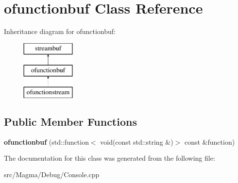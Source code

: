\hypertarget{classofunctionbuf}{}\section{ofunctionbuf Class Reference}
\label{classofunctionbuf}
Inheritance diagram for ofunctionbuf\+:\begin{figure}[H]
\begin{center}
\leavevmode
\includegraphics[height=3.000000cm]{classofunctionbuf}
\end{center}
\end{figure}
\subsection*{Public Member Functions}
\begin{DoxyCompactItemize}
\item 
\mbox{\label{classofunctionbuf_ac4c827b2738de8c625a1316e15643f3d}} 
{\bfseries ofunctionbuf} (std\+::function$<$ void(const std\+::string \&)$>$ const \&function)
\end{DoxyCompactItemize}


The documentation for this class was generated from the following file\+:\begin{DoxyCompactItemize}
\item 
src/\+Magma/\+Debug/Console.\+cpp\end{DoxyCompactItemize}
